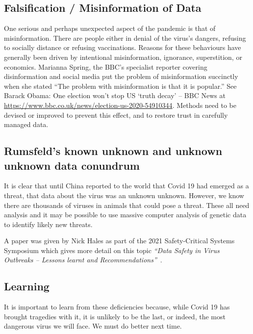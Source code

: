 \subsection{Falsification / Misinformation of Data}
One serious and perhaps unexpected aspect of the pandemic is that of misinformation. There are people either in denial of the virus’s dangers, refusing to socially distance or refusing vaccinations. Reasons for these behaviours have generally been driven by intentional misinformation, ignorance, superstition, or economics. Marianna Spring, the BBC’s specialist reporter covering disinformation and social media put the problem of misinformation succinctly when she stated “The problem with misinformation is that it is popular.” See Barack Obama: One election won't stop US `truth decay' -- BBC News at \href{https://www.bbc.co.uk/news/election-us-2020-54910344}{https://www.bbc.co.uk/news/election-us-2020-54910344}. Methods need to be devised or improved to prevent this effect, and to restore trust in carefully managed data. 

\subsection{Rumsfeld’s known unknown and unknown unknown data conundrum}

It is clear that until China reported to the world that Covid 19 had emerged as a threat, that data about the virus was an unknown unknown. However, we know there are thousands of viruses in animals that could pose a threat. These all need analysis and it may be possible to use massive computer analysis of genetic data to identify likely new threats. 
	
A paper was
given by Nick Hales as part of the 2021 Safety-Critical Systems Symposium which gives more detail on this topic {\it“Data Safety in Virus Outbreaks -- Lessons learnt and Recommendations”}~\cite{citation:SCSC161}.

\subsection{Learning}

It is important to learn from these deficiencies because, while Covid 19 has brought tragedies with it, it is unlikely to be the last, or indeed, the most dangerous virus we will face. We must do better next time.
